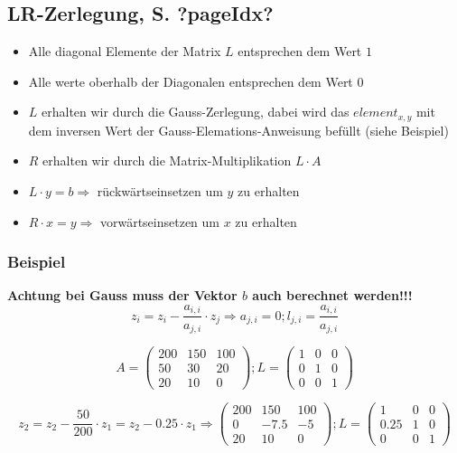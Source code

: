 \subsection{LR-Zerlegung, S. ?pageIdx?}

\begin{itemize}
\item Alle diagonal Elemente der Matrix $L$ entsprechen dem Wert $1$
\item Alle werte oberhalb der Diagonalen entsprechen dem Wert $0$ 
\item $L$ erhalten wir durch die Gauss-Zerlegung, dabei wird das $element_{x,y}$ mit dem inversen Wert der Gauss-Elemations-Anweisung befüllt (siehe Beispiel)
\item $R$ erhalten wir durch die Matrix-Multiplikation $L\cdot A$
\item $L \cdot y = b \Rightarrow $ rückwärtseinsetzen um $y$ zu erhalten
\item $R \cdot x = y \Rightarrow $ vorwärtseinsetzen um $x$ zu erhalten
\end{itemize}

\subsubsection{Beispiel}
\textbf{Achtung bei Gauss muss der Vektor $b$ auch berechnet werden!!!}
\[ z_i = z_i - \frac{a_{i,i}}{a_{j,i}} \cdot z_j \Rightarrow a_{j,i}=0; l_{j,i}=\frac{a_{i,i}}{a_{j,i}}\]


\[ A= \left( \begin{array}{ccc}
200 & 150 & 100\\
50 & 30 & 20\\
20 & 10 & 0 \end{array}\right); L= \left( \begin{array}{ccc}
1 & 0 & 0\\
0 & 1 & 0\\
0 & 0 & 1\end{array} \right) \]

\[ z_2 = z_2 - \frac{50}{200} \cdot z_1 = z_2 - 0.25 \cdot z_1 \Rightarrow \left( \begin{array}{ccc}
200 & 150 & 100\\
0 & -7.5 & -5\\
20 & 10 & 0 \end{array}\right); L= \left( \begin{array}{ccc}
1 & 0 & 0\\
0.25 & 1 & 0\\
0 & 0 & 1\end{array} \right) \]

